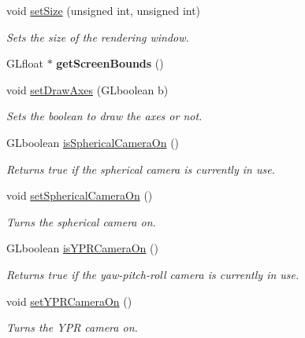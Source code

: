 \begin{DoxyCompactItemize}
void \hyperlink{class_graphics_engine_aac1a9cc3d195ed1f28018dffd80dae41}{set\+Size} (unsigned int, unsigned int)
\begin{DoxyCompactList}\small\item\em Sets the size of the rendering window. \end{DoxyCompactList}\item 
\mbox{\label{class_graphics_engine_a95a17b256079f26ca2b73ec3210317d2}} 
G\+Lfloat $\ast$ {\bfseries get\+Screen\+Bounds} ()
\item 
void \hyperlink{class_graphics_engine_abc1591d1873ad66188c5b7613606e8ab}{set\+Draw\+Axes} (G\+Lboolean b)
\begin{DoxyCompactList}\small\item\em Sets the boolean to draw the axes or not. \end{DoxyCompactList}\item 
G\+Lboolean \hyperlink{class_graphics_engine_a45375adf56d4769b0f33206dc760a1f6}{is\+Spherical\+Camera\+On} ()
\begin{DoxyCompactList}\small\item\em Returns true if the spherical camera is currently in use. \end{DoxyCompactList}\item 
\mbox{\label{class_graphics_engine_a82227c52191595cf7ca7aaea82396a01}} 
void \hyperlink{class_graphics_engine_a82227c52191595cf7ca7aaea82396a01}{set\+Spherical\+Camera\+On} ()
\begin{DoxyCompactList}\small\item\em Turns the spherical camera on. \end{DoxyCompactList}\item 
G\+Lboolean \hyperlink{class_graphics_engine_a8ed6b779b8696620241ba701afd6de67}{is\+Y\+P\+R\+Camera\+On} ()
\begin{DoxyCompactList}\small\item\em Returns true if the yaw-\/pitch-\/roll camera is currently in use. \end{DoxyCompactList}\item 
\mbox{\label{class_graphics_engine_a322229c8ad08ee37b26c047761ca7b80}} 
void \hyperlink{class_graphics_engine_a322229c8ad08ee37b26c047761ca7b80}{set\+Y\+P\+R\+Camera\+On} ()
\begin{DoxyCompactList}\small\item\em Turns the Y\+PR camera on. \end{DoxyCompactList}\item 

\end{DoxyCompactItemize}
